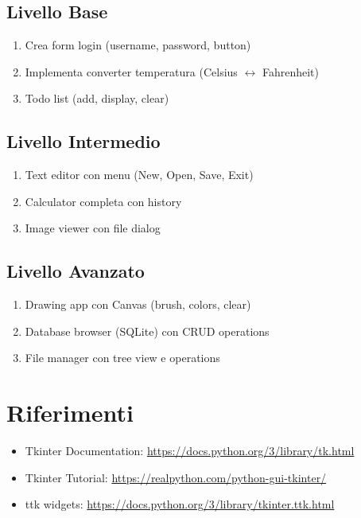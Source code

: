 \subsection{Livello Base}
\begin{enumerate}
  \item Crea form login (username, password, button)
  \item Implementa converter temperatura (Celsius $\leftrightarrow$ Fahrenheit)
  \item Todo list (add, display, clear)
\end{enumerate}

\subsection{Livello Intermedio}
\begin{enumerate}
  \item Text editor con menu (New, Open, Save, Exit)
  \item Calculator completa con history
  \item Image viewer con file dialog
\end{enumerate}

\subsection{Livello Avanzato}
\begin{enumerate}
  \item Drawing app con Canvas (brush, colors, clear)
  \item Database browser (SQLite) con CRUD operations
  \item File manager con tree view e operations
\end{enumerate}

\section{Riferimenti}
\begin{itemize}
  \item Tkinter Documentation: \url{https://docs.python.org/3/library/tk.html}
  \item Tkinter Tutorial: \url{https://realpython.com/python-gui-tkinter/}
  \item ttk widgets: \url{https://docs.python.org/3/library/tkinter.ttk.html}
\end{itemize}
